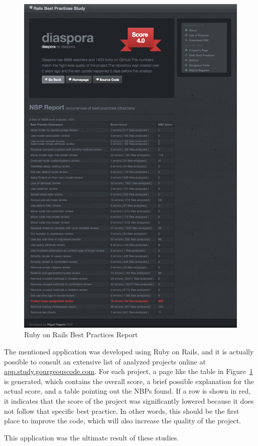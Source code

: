 \begin{figure}[h!]
  \caption{Ruby on Rails Best Practices Report}\label{fig:rbp_s}
  \centering
  \includegraphics[scale=0.75]{Images/rbp_s}
\end{figure}

The mentioned application was developed using Ruby on Rails, and it is actually possible to consult an extensive list of analyzed projects online at \url{app.study.gourgeouscode.com}. For each project, a page like the table in Figure~\ref{fig:rbp_s} is generated, 
which contains the overall score, a brief possible explanation for the actual score, and a table pointing out the 
NBPs found. If a row is shown in red, it indicates that the score of the project was significantly lowered because 
it does not follow that specific best practice. In other words, this should be the first place to improve the code,
which will also increase the quality of the project.

This application was the ultimate result of these studies.












